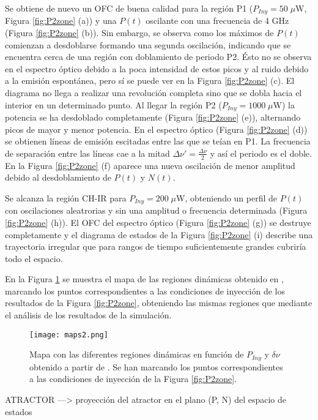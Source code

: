 		Se obtiene de nuevo un OFC de buena calidad para la región P1 ($P_{Iny} = 50\;\mu$W, Figura \ref{fig:P2zone} (a)) y una $P(t)$ oscilante con una frecuencia de 4 GHz (Figura \ref{fig:P2zone} (b)). Sin embargo, se observa como los máximos de $P(t)$ comienzan a desdoblarse formando una segunda oscilación, indicando que se encuentra cerca de una región con doblamiento de periodo P2. Ésto no se observa en el espectro óptico debido a la poca intensidad de estos picos y al ruido debido a la emisión espontánea, pero sí se puede ver en la Figura \ref{fig:P2zone} (c). El diagrama no llega a realizar una revolución completa sino que se dobla hacia el interior en un determinado punto. Al llegar la región P2 ($P_{Iny} = 1000\;\mu$W) la potencia se ha desdoblado completamente (Figura \ref{fig:P2zone} (e)), alternando picos de mayor y menor potencia. En el espectro óptico (Figura \ref{fig:P2zone} (d)) se obtienen líneas de emisión escitadas entre las que se teían en P1. La frecuencia de separación entre las líneas cae a la mitad $\Delta \nu' = \frac{\Delta\nu}{2}$ y así el periodo es el doble. En la Figura \ref{fig:P2zone} (f) aparece una nueva oscilación de menor amplitud debido al desdoblamiento de $P(t)$ y $N(t)$.

		Se alcanza la región CH-IR para $P_{Iny} = 200\;\mu$W, obteniendo un perfil de $P(t)$ con oscilaciones aleatrorias y sin una amplitud o frecuencia determinada (Figura \ref{fig:P2zone} (h)). El OFC del espectro óptico (Figura \ref{fig:P2zone} (g)) se destruye completamente y el diagrama de estados de la Figura \ref{fig:P2zone} (i) describe una trayectoria irregular que para rangos de tiempo suficientemente grandes cubriría todo el espacio. 

		En la Figura \ref{fig:maps2} se muestra el mapa de las regiones dinámicas obtenido en \cite{Chaves19}, marcando los puntos correspondientes a las condiciones de inyección de los resultados de la Figura \ref{fig:P2zone}, obteniendo las mismas regiones que mediante el análisis de los resultados de la simulación.

			\begin{figure}[H]
				\centering
				\texttt{[image: maps2.png]}
				\caption{\label{fig:maps2}Mapa con las diferentes regiones dinámicas en función de $P_{Iny}$ y $\delta\nu$ obtenido a partir de \cite{Chaves19}. Se han marcando los puntos correspondientes a las condiciones de inyección de la Figura \ref{fig:P2zone}.}	
			\end{figure}


ATRACTOR ---> proyección  del atractor en el plano (P, N) del espacio de estados

